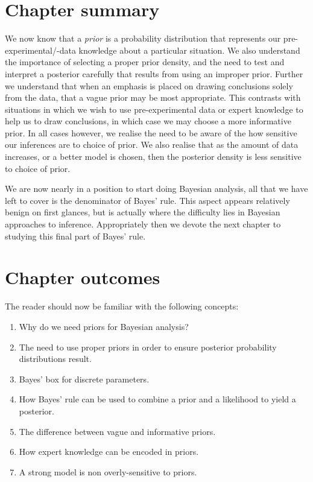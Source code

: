 \documentclass[11pt,fullpage]{book}
\begin{document}
\section{Chapter summary}
We now know that a \textit{prior} is a probability distribution that represents our pre-experimental/-data knowledge about a particular situation. We also understand the importance of selecting a proper prior density, and the need to test and interpret a posterior carefully that results from using an improper prior. Further we understand that when an emphasis is placed on drawing conclusions solely from the data, that a vague prior may be most appropriate. This contrasts with situations in which we wish to use pre-experimental data or expert knowledge to help us to draw conclusions, in which case we may choose a more informative prior. In all cases however, we realise the need to be aware of the how sensitive our inferences are to choice of prior. We also realise that as the amount of data increases, or a better model is chosen, then the posterior density is less sensitive to choice of prior.

We are now nearly in a position to start doing Bayesian analysis, all that we have left to cover is the denominator of Bayes' rule. This aspect appears relatively benign on first glances, but is actually where the difficulty lies in Bayesian approaches to inference. Appropriately then we devote the next chapter to studying this final part of Bayes' rule.

\section{Chapter outcomes}
The reader should now be familiar with the following concepts:
\begin{enumerate}
\item Why do we need priors for Bayesian analysis?
\item The need to use proper priors in order to ensure posterior probability distributions result.
\item Bayes' box for discrete parameters.
\item How Bayes' rule can be used to combine a prior and a likelihood to yield a posterior.
\item The difference between vague and informative priors.
\item How expert knowledge can be encoded in priors.
\item A strong model is non overly-sensitive to priors.
\end{enumerate}
\end{document}
